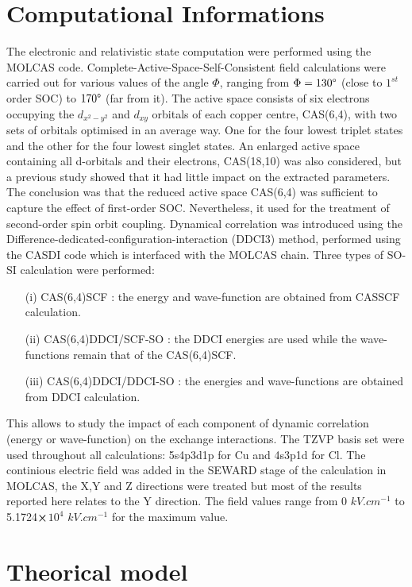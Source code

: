 \documentclass[12pt]{report}
\numberwithin{equation}{section}
\begin{document}
\section{Computational Informations}

The electronic and relativistic state computation were performed using the MOLCAS code.
Complete-Active-Space-Self-Consistent field calculations were carried out for various values of the angle $\Phi$, ranging from $\Phi=130\degree$ (close to $1^{st}$ order SOC) to $170\degree$ (far from it).
The active space consists of six electrons occupying the $d_{x^2-y^2}$ and $d_{xy}$ orbitals of each copper centre, CAS(6,4), with two sets of orbitals optimised in an average way.
One for the four lowest triplet states and the other for the four lowest singlet states.
An enlarged active space containing all d-orbitals and their electrons, CAS(18,10) was also considered, but a previous study showed that it had little impact on the extracted parameters. The conclusion was that the reduced active space CAS(6,4) was sufficient to capture the effect of first-order SOC.
Nevertheless, it used for the treatment of second-order spin orbit coupling.
Dynamical correlation was introduced using the Difference-dedicated-configuration-interaction (DDCI3) method, performed using the CASDI code which is interfaced with the MOLCAS chain.
Three types of SO-SI calculation were performed:
\begin{itemize}
    \item[(i)] CAS(6,4)SCF : the energy and wave-function are obtained from CASSCF calculation.
    \item[(ii)] CAS(6,4)DDCI/SCF-SO : the DDCI energies are used while the wave-functions remain that of the CAS(6,4)SCF.
    \item[(iii)] CAS(6,4)DDCI/DDCI-SO : the energies and wave-functions are obtained from DDCI calculation.
\end{itemize}
This allows to study the impact of each component of dynamic correlation (energy or wave-function) on the exchange interactions.
The TZVP basis set were used throughout all calculations: 5s4p3d1p for Cu and 4s3p1d for Cl.
The continious electric field was added in the SEWARD stage of the calculation in MOLCAS, the X,Y and Z directions were treated but most of the results reported here relates to the Y direction.
The field values range from 0 $kV.cm^{-1}$ to 5.1724$\cross$$10^4$ $kV.cm^{-1}$ for the maximum value.
\section{Theorical model}
\end{document}
